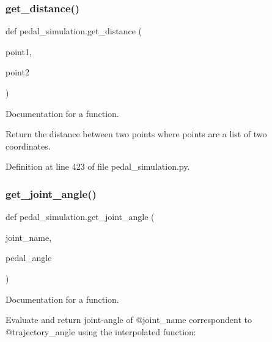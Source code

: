 \subsubsection{\texorpdfstring{get\_distance()}{get\_distance()}}
{\footnotesize\ttfamily def pedal\+\_\+simulation.\+get\+\_\+distance (\begin{DoxyParamCaption}\item[{}]{point1,  }\item[{}]{point2 }\end{DoxyParamCaption})}



Documentation for a function. 

Return the distance between two points where points are a list of two coordinates. 

Definition at line 423 of file pedal\+\_\+simulation.\+py.


\begin{DoxyCode}{0}

\end{DoxyCode}
\mbox{\label{namespacepedal__simulation_a05ba3597b304090a3db746672dfe7d75}} 
\subsubsection{\texorpdfstring{get\_joint\_angle()}{get\_joint\_angle()}}
{\footnotesize\ttfamily def pedal\+\_\+simulation.\+get\+\_\+joint\+\_\+angle (\begin{DoxyParamCaption}\item[{}]{joint\+\_\+name,  }\item[{}]{pedal\+\_\+angle }\end{DoxyParamCaption})}



Documentation for a function. 

Evaluate and return joint-\/angle of @joint\+\_\+name correspondent to @trajectory\+\_\+angle using the interpolated function\+:

